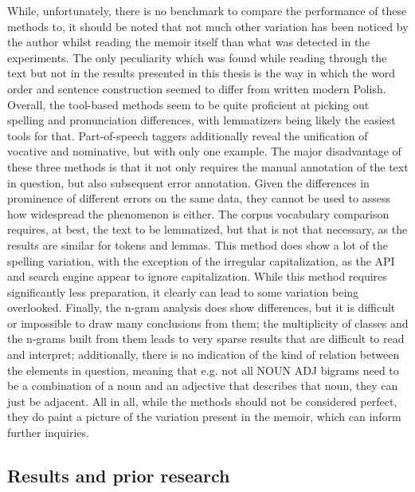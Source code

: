 While, unfortunately, there is no benchmark to compare the performance of these methods to, it should be noted that not much other variation has been noticed by the author whilst reading the memoir itself than what was detected in the experiments. The only peculiarity which was found while reading through the text but not in the results presented in this thesis is the way in which the word order and sentence construction seemed to differ from written modern Polish. Overall, the tool-based methods seem to be quite proficient at picking out spelling and pronunciation differences, with lemmatizers being likely the easiest tools for that. Part-of-speech taggers additionally reveal the unification of vocative and nominative, but with only one example. The major disadvantage of these three methods is that it not only requires the manual annotation of the text in question, but also subsequent error annotation. Given the differences in prominence of different errors on the same data, they cannot be used to assess how widespread the phenomenon is either. The corpus vocabulary comparison requires, at best, the text to be lemmatized, but that is not that necessary, as the results are similar for tokens and lemmas. This method does show a lot of the spelling variation, with the exception of the irregular capitalization, as the API and search engine appear to ignore capitalization. While this method requires significantly less preparation, it clearly can lead to some variation being overlooked. Finally, the n-gram analysis does show differences, but it is difficult or impossible to draw many conclusions from them; the multiplicity of classes and the n-grams built from them leads to very sparse results that are difficult to read and interpret; additionally, there is no indication of the kind of relation between the elements in question, meaning that e.g. not all NOUN ADJ bigrams need to be a combination of a noun and an adjective that describes that noun, they can just be adjacent. All in all, while the methods should not be considered perfect, they do paint a picture of the variation present in the memoir, which can inform further inquiries.

\subsection{Results and prior research}
\label{subsec:results-and-background}

